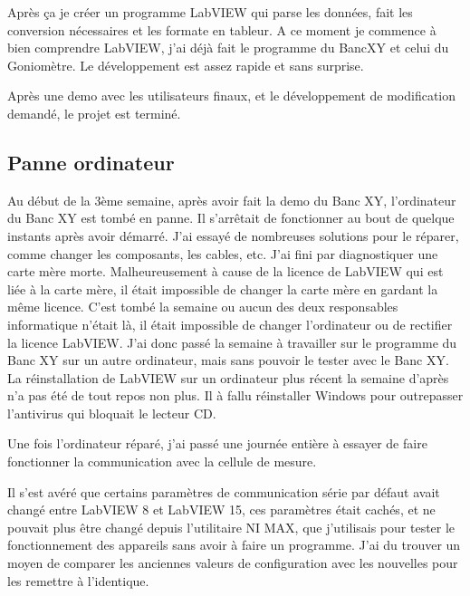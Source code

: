 \documentclass[12pt]{article}
\begin{document}
Après ça je créer un programme LabVIEW qui parse les données, fait les conversion nécessaires et les formate en tableur.
A ce moment je commence à bien comprendre LabVIEW, j'ai déjà fait le programme du BancXY et celui du Goniomètre.
Le développement est assez rapide et sans surprise.

Après une demo avec les utilisateurs finaux, et le développement de modification demandé, le projet est terminé.

\subsection{ Panne ordinateur }

Au début de la 3ème semaine, après avoir fait la demo du Banc XY, l'ordinateur du Banc XY est tombé en panne.
Il s'arrêtait de fonctionner au bout de quelque instants après avoir démarré.
J'ai essayé de nombreuses solutions pour le réparer, comme changer les composants, les cables, etc.
J'ai fini par diagnostiquer une carte mère morte.
Malheureusement à cause de la licence de LabVIEW qui est liée à la carte mère, il était impossible de changer la carte mère en gardant la même licence.
C'est tombé la semaine ou aucun des deux responsables informatique n'était là, il était impossible de changer l'ordinateur ou de rectifier la licence LabVIEW.
J'ai donc passé la semaine à travailler sur le programme du Banc XY sur un autre ordinateur, mais sans pouvoir le tester avec le Banc XY.
La réinstallation de LabVIEW sur un ordinateur plus récent la semaine d'après n'a pas été de tout repos non plus.
Il à fallu réinstaller Windows pour outrepasser l'antivirus qui bloquait le lecteur CD.

Une fois l'ordinateur réparé, j'ai passé une journée entière à essayer de faire fonctionner la communication avec la cellule de mesure.

\newpage




Il s'est avéré que certains paramètres de communication série par défaut avait changé entre LabVIEW 8 et LabVIEW 15, ces paramètres était cachés, et ne pouvait plus être changé depuis l'utilitaire NI MAX, que j'utilisais pour tester le fonctionnement des appareils sans avoir à faire un programme.
J'ai du trouver un moyen de comparer les anciennes valeurs de configuration avec les nouvelles pour les remettre à l'identique.



\printglossaries
\end{document}
